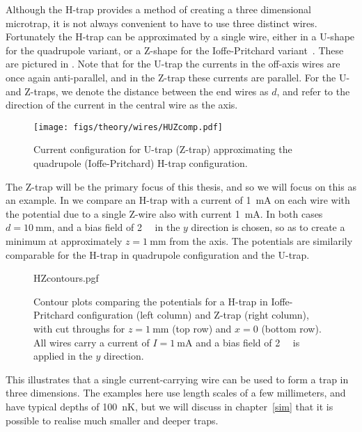 Although the H-trap provides a method of creating a three dimensional
microtrap, it is not always convenient to have to use three distinct wires.
Fortunately the H-trap can be approximated by a single wire, either in a
U-shape for the quadrupole variant, or a Z-shape for the Ioffe-Pritchard
variant~\cite{2011Ac}. These are pictured in . Note
that for the U-trap the currents in the off-axis wires are once again
anti-parallel, and in the Z-trap these currents are parallel. For the U- and
Z-traps, we denote the distance between the end wires as $d$, and refer
to the direction of the current in the central wire as the axis.

\begin{figure}[htbp]
  \centering
  \texttt{[image: figs/theory/wires/HUZcomp.pdf]}
  \caption[U- and Z-traps]{Current configuration for U-trap (Z-trap)
  approximating the quadrupole (Ioffe-Pritchard) H-trap configuration.}
  \label{theory:fig:HUZ}
\end{figure}

The Z-trap will be the primary focus of this thesis, and so we will focus on
this as an example. In  we compare an H-trap
with a current of \SI{1}{\milli\ampere} on each wire with the potential due to
a single Z-wire also with current \SI{1}{\milli\ampere}. In both cases
$d=\SI{10}{\milli\meter}$, and a bias field of \SI{2}{\milli\gauss} in the $y$
direction is chosen, so as to create a minimum at approximately
$z=\SI{1}{\milli\meter}$ from the axis. The potentials are similarily
comparable for the H-trap in quadrupole configuration and the U-trap.

\begin{figure}[htbp]
  \centering
  {HZcontours.pgf}
  \caption[Comparison of H- and Z-traps]{
    Contour plots comparing the potentials for a H-trap in
    Ioffe-Pritchard configuration (left column) and Z-trap (right column), with
    cut throughs for $z=\SI{1}{\milli\meter}$ (top row) and $x=0$ (bottom row).
    All wires carry a current of $I=\SI{1}{\milli\ampere}$ and a bias field of
    \SI{2}{\milli\gauss} is applied in the $y$ direction.}
  \label{theory:fig:HZcontours}
\end{figure}

This illustrates that a single current-carrying wire can be used to form a trap
in three dimensions. The examples here use length scales of a few millimeters,
and have typical depths of \SI{100}{\nano\kelvin}, but we will discuss in
chapter~\ref{sim} that it is possible to realise much smaller and deeper traps.


